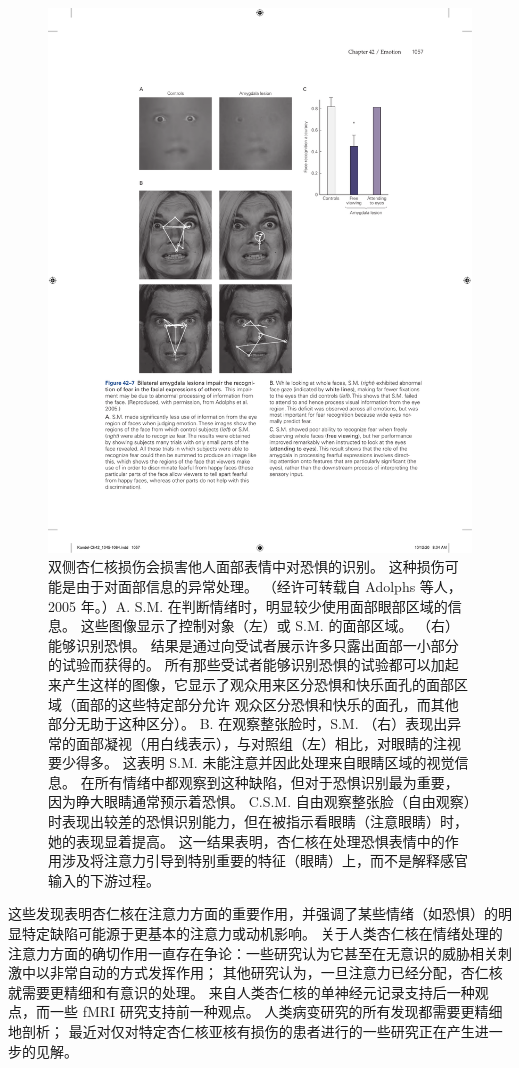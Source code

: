 \begin{figure}[htbp]
	\centering
	\includegraphics[width=0.75\linewidth]{chap42/fig_42_7}
	\caption{双侧杏仁核损伤会损害他人面部表情中对恐惧的识别。 这种损伤可能是由于对面部信息的异常处理。 （经许可转载自 Adolphs 等人，2005 年。）A. S.M. 在判断情绪时，明显较少使用面部眼部区域的信息。 这些图像显示了控制对象（左）或 S.M. 的面部区域。 （右）能够识别恐惧。 结果是通过向受试者展示许多只露出面部一小部分的试验而获得的。 所有那些受试者能够识别恐惧的试验都可以加起来产生这样的图像，它显示了观众用来区分恐惧和快乐面孔的面部区域（面部的这些特定部分允许 观众区分恐惧和快乐的面孔，而其他部分无助于这种区分）。 B. 在观察整张脸时，S.M. （右）表现出异常的面部凝视（用白线表示），与对照组（左）相比，对眼睛的注视要少得多。 这表明 S.M. 未能注意并因此处理来自眼睛区域的视觉信息。 在所有情绪中都观察到这种缺陷，但对于恐惧识别最为重要，因为睁大眼睛通常预示着恐惧。 C.S.M. 自由观察整张脸（自由观察）时表现出较差的恐惧识别能力，但在被指示看眼睛（注意眼睛）时，她的表现显着提高。 这一结果表明，杏仁核在处理恐惧表情中的作用涉及将注意力引导到特别重要的特征（眼睛）上，而不是解释感官输入的下游过程。}
	\label{fig:42_7}
\end{figure}


这些发现表明杏仁核在注意力方面的重要作用，并强调了某些情绪（如恐惧）的明显特定缺陷可能源于更基本的注意力或动机影响。
关于人类杏仁核在情绪处理的注意力方面的确切作用一直存在争论：一些研究认为它甚至在无意识的威胁相关刺激中以非常自动的方式发挥作用；
其他研究认为，一旦注意力已经分配，杏仁核就需要更精细和有意识的处理。
来自人类杏仁核的单神经元记录支持后一种观点，而一些 fMRI 研究支持前一种观点。
人类病变研究的所有发现都需要更精细地剖析；
最近对仅对特定杏仁核亚核有损伤的患者进行的一些研究正在产生进一步的见解。



